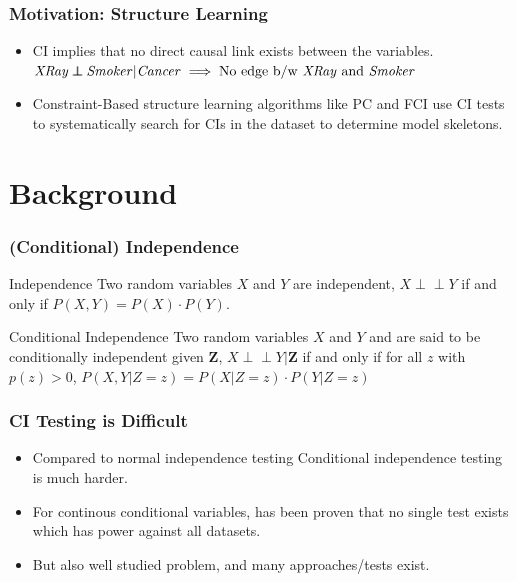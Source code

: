\documentclass{beamer}
\def\ci{\perp\!\!\!\!\!\perp}
\begin{document}
\begin{frame}
	\frametitle{Motivation: Structure Learning}
	\begin{itemize}
		\setlength\itemsep{1em}
		\item CI implies that no direct causal link exists between the variables. \newline
			$ \text{\emph{XRay}} \ci \text{\emph{Smoker}} | \text{\emph{Cancer}} \implies \text{No edge b/w \emph{XRay} and \emph{Smoker}} $

		\item Constraint-Based structure learning algorithms like PC
			and FCI use CI tests to systematically search for CIs
			in the dataset to determine model skeletons.
	\end{itemize}
\end{frame}

\section{Background}
\begin{frame}
	\frametitle{(Conditional) Independence}
	\begin{block}{Independence}
		Two random variables $ X $ and $ Y $ are independent,
		$ X \ci Y $ if and only if $ P(X, Y) = P(X) \cdot P(Y) $.
	\end{block}
	\vspace{1em}

	\begin{block}{Conditional Independence}
		Two random variables $ X $ and $ Y $ and are said to be
		conditionally independent given $ \bm{Z} $, $ X \ci Y | \bm{Z}
		$ if and only if for all $ z $ with $ p(z) > 0 $, $ P(X, Y |
		Z=z) = P(X | Z=z) \cdot P(Y | Z=z) $
	\end{block}
\end{frame}

\begin{frame}
	\frametitle{CI Testing is Difficult}
	\begin{itemize}
		\setlength\itemsep{1em}
		\item Compared to normal independence testing Conditional independence testing is much harder.
		\item For continous conditional variables, has been proven that no single 
		      test exists which has power against all datasets. \footnotemark
		\item But also well studied problem, and many approaches/tests exist.
	\end{itemize}

\end{frame}
\end{document}
